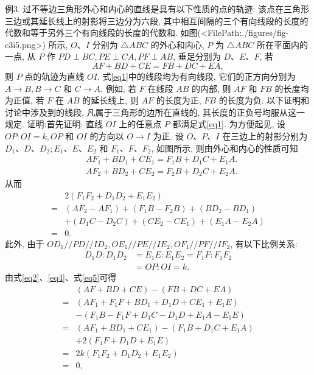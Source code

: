 例3. 过不等边三角形外心和内心的直线是具有以下性质的点的轨迹: 该点在三角形三边或其延长线上的射影将三边分为六段, 其中相互间隔的三个有向线段的长度的代数和等于另外三个有向线段的长度的代数和.
如图(<FilePath:./figures/fig-c3i5.png>) 所示, $O 、 I$ 分别为 $\triangle A B C$ 的外心和内心, $P$ 为 $\triangle A B C$ 所在平面内的一点, 从 $P$ 作 $P D \perp B C, P E \perp C A, P F \perp A B$, 垂足分别为 $D 、 E 、 F$, 若
$$
A F+B D+C E=F B+D C+E A, \label{eq1}
$$
则 $P$ 点的轨迹为直线 $O I$.
式\ref{eq1}中的线段均为有向线段, 它们的正方向分别为 $A \rightarrow B, B \rightarrow C$ 和 $C \rightarrow A$. 例如, 若 $F$ 在线段 $A B$ 的内部, 则 $A F$ 和 $F B$ 的长度均为正值, 若 $F$ 在 $A B$ 的延长线上, 则 $A F$ 的长度为正, $F B$ 的长度为负.
以下证明和讨论中涉及到的线段, 凡属于三角形的边所在直线的, 其长度的正负号均服从这一规定.
证明:首先证明: 直线 $O I$ 上的任意点 $P$ 都满足式\ref{eq1}. 为方便起见, 设 $O P: O I=k, O P$ 和 $O I$ 的方向以 $O \rightarrow I$ 为正.
设 $O 、 P 、 I$ 在三边上的射影分别为 $D_1 、 D 、 D_2 ; E_1 、 E 、 E_2$ 和 $F_1 、 F 、 F_2$, 如图所示, 则由外心和内心的性质可知
$$
\begin{aligned}
& A F_1+B D_1+C E_1=F_1 B+D_1 C+E_1 A . \label{eq2} \\
& A F_2+B D_2+C E_2=F_2 B+D_2 C+E_2 A . \label{eq3}
\end{aligned}
$$
从而
$$
\begin{aligned}
& 2\left(F_1 F_2+D_1 D_2+E_1 E_2\right) \\
= & \left(A F_2-A F_1\right)+\left(F_1 B-F_2 B\right)+\left(B D_2-B D_1\right) \\
& +\left(D_1 C-D_2 C\right)+\left(C E_2-C E_1\right)+\left(E_1 A-E_2 A\right) \\
= & 0 .
\end{aligned} \label{eq4}
$$
此外, 由于 $O D_1 / / P D / / I D_2, O E_1 / / P E / / I E_2, O F_1 / / P F / / I F_2$, 有以下比例关系:
$$
\begin{aligned}
D_1 D: D_1 D_2 & =E_1 E: E_1 E_2=F_1 F: F_1 F_2 \\
& =O P: O I=k .
\end{aligned} \label{eq5}
$$
由式\ref{eq2}、\ref{eq4}、式\ref{eq5}可得
$$
\begin{aligned}
& (A F+B D+C E)-(F B+D C+E A) \\
= & \left(A F_1+F_1 F+B D_1+D_1 D+C E_1+E_1 E\right) \\
& -\left(F_1 B-F_1 F+D_1 C-D_1 D+E_1 A-E_1 E\right) \\
= & \left(A F_1+B D_1+C E_1\right)-\left(F_1 B+D_1 C+E_1 A\right) \\
& +2\left(F_1 F+D_1 D+E_1 E\right) \\
= & 2 k\left(F_1 F_2+D_1 D_2+E_1 E_2\right) \\
= & 0,
\end{aligned}
$$

